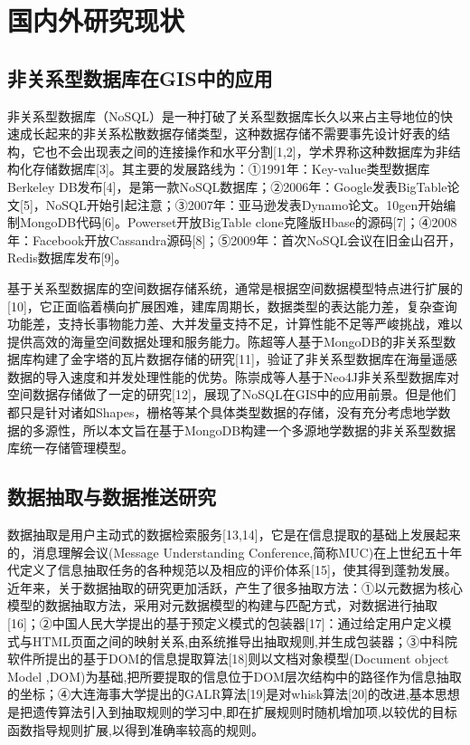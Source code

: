 \documentclass[master]{njnuthesis}
\begin{document}
\section{国内外研究现状}
\subsection{非关系型数据库在GIS中的应用}
非关系型数据库（NoSQL）是一种打破了关系型数据库长久以来占主导地位的快速成长起来的非关系松散数据存储类型，这种数据存储不需要事先设计好表的结构，它也不会出现表之间的连接操作和水平分割[1,2]，学术界称这种数据库为非结构化存储数据库[3]。其主要的发展路线为：①1991年：Key-value类型数据库Berkeley DB发布[4]，是第一款NoSQL数据库；②2006年：Google发表BigTable论文[5]，NoSQL开始引起注意；③2007年：亚马逊发表Dynamo论文。10gen开始编制MongoDB代码[6]。Powerset开放BigTable clone克隆版Hbase的源码[7]；④2008年：Facebook开放Cassandra源码[8]；⑤2009年：首次NoSQL会议在旧金山召开，Redis数据库发布[9]。

基于关系型数据库的空间数据存储系统，通常是根据空间数据模型特点进行扩展的[10]，它正面临着横向扩展困难，建库周期长，数据类型的表达能力差，复杂查询功能差，支持长事物能力差、大并发量支持不足，计算性能不足等严峻挑战，难以提供高效的海量空间数据处理和服务能力。陈超等人基于MongoDB的非关系型数据库构建了金字塔的瓦片数据存储的研究[11]，验证了非关系型数据库在海量遥感数据的导入速度和并发处理性能的优势。陈崇成等人基于Neo4J非关系型数据库对空间数据存储做了一定的研究[12]，展现了NoSQL在GIS中的应用前景。但是他们都只是针对诸如Shapes，栅格等某个具体类型数据的存储，没有充分考虑地学数据的多源性，所以本文旨在基于MongoDB构建一个多源地学数据的非关系型数据库统一存储管理模型。

\subsection{数据抽取与数据推送研究}
数据抽取是用户主动式的数据检索服务[13,14]，它是在信息提取的基础上发展起来的，消息理解会议(Message Understanding Conference,简称MUC)在上世纪五十年代定义了信息抽取任务的各种规范以及相应的评价体系[15]，使其得到蓬勃发展。近年来，关于数据抽取的研究更加活跃，产生了很多抽取方法：①以元数据为核心模型的数据抽取方法，采用对元数据模型的构建与匹配方式，对数据进行抽取[16]；②中国人民大学提出的基于预定义模式的包装器[17]：通过给定用户定义模式与HTML页面之间的映射关系,由系统推导出抽取规则,并生成包装器；③中科院软件所提出的基于DOM的信息提取算法[18]则以文档对象模型(Document object Model ,DOM)为基础,把所要提取的信息位于DOM层次结构中的路径作为信息抽取的坐标；④大连海事大学提出的GALR算法[19]是对whisk算法[20]的改进,基本思想是把遗传算法引入到抽取规则的学习中,即在扩展规则时随机增加项,以较优的目标函数指导规则扩展,以得到准确率较高的规则。
\end{document}
